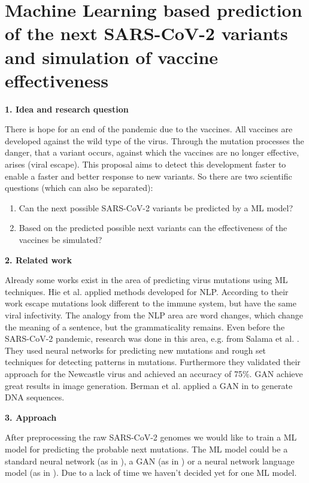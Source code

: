 \section{Machine Learning based prediction of the next SARS-CoV-2 variants and simulation of vaccine effectiveness} \label{proposal1}

\textbf{1. Idea and research question}

There is hope for an end of the pandemic due to the vaccines. All vaccines are developed against the wild type of the virus. Through the mutation processes the danger, that a variant occurs, against which the vaccines  are no longer effective, arises (viral escape). This proposal aims to detect this development faster to enable a faster and better response to new variants. So there are two scientific questions (which can also be separated):

\begin{enumerate}
	\item Can the next possible SARS-CoV-2 variants be predicted by a \ac{ML} model?
	\item Based on the  predicted possible next variants can the effectiveness of the vaccines be simulated?
\end{enumerate}

\textbf{2. Related work}

Already some works exist in the area of predicting virus mutations using \ac{ML} techniques. Hie et al. \cite{Hie2021} applied methods developed for \ac{NLP}.  According to their work escape mutations look different to the immune system, but have the same viral infectivity. The analogy from the \ac{NLP} area are word changes, which change the meaning of a sentence, but the grammaticality remains. %
Even before the SARS-CoV-2 pandemic, research was done in this area, e.g. from Salama et al. \cite{Salama2016}. They used neural networks for predicting new mutations and rough set techniques for detecting patterns in mutations. Furthermore they validated their approach for the Newcastle virus and achieved an accuracy of 75\%. \ac{GAN} achieve great results in image generation. Berman et al. applied a \ac{GAN} in \cite{Berman2020} to generate \ac{DNA} sequences.

\textbf{3. Approach}

After preprocessing the raw SARS-CoV-2 genomes we would like to train a \ac{ML} model for predicting the probable next mutations. The \ac{ML} model could be a standard neural network (as in  \cite{Salama2016}), a GAN (as in \cite{Berman2020}) or a neural network language model (as in \cite{Hie2021}). Due to a lack of time we haven't decided yet for one \ac{ML} model.

